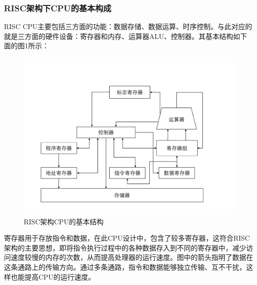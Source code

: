 \documentclass[titlepage, 11pt]{article}
\begin{document}
	\subsubsection{RISC架构下CPU的基本构成}
	RISC CPU主要包括三方面的功能：数据存储、数据运算、时序控制。与此对应的就是三方面的硬件设备：寄存器和内存、运算器ALU、控制器。其基本结构如下面的图1所示：
	\begin{figure}[htb]
		\centering
		\includegraphics[scale=0.6]{1.pdf}
		\caption{RISC架构CPU的基本结构}
	\end{figure}\par 
	寄存器用于存放指令和数据，在此CPU设计中，包含了较多寄存器，这符合RISC架构的主要思想，即将指令执行过程中的各种数据存入到不同的寄存器中，减少访问速度较慢的内存的次数，从而提高处理器的运行速度。图中的箭头指明了数据在这条通路上的传输方向。通过多条通路，指令和数据能够独立传输、互不干扰，这样也能提高CPU的运行速度。
\end{document}
